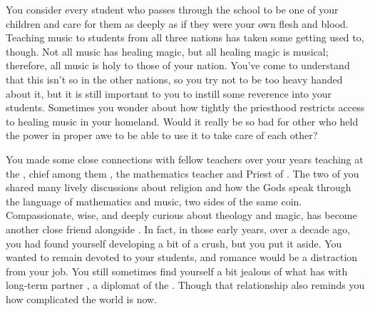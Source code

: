 \documentclass[char]{GL2020}
\begin{document}
You consider every student who passes through the school to be one of your children and care for them as deeply as if they were your own flesh and blood. Teaching music to students from all three nations has taken some getting used to, though. Not all music has healing magic, but all \pFarm{} healing magic is musical; therefore, all music is holy to those of your nation. You've come to understand that this isn't so in the other nations, so you try not to be too heavy handed about it, but it is still important to you to instill some reverence into your students. Sometimes you wonder about how tightly the priesthood restricts access to healing music in your homeland. Would it really be so bad for other \pFarmers{} who held the power in proper awe to be able to use it to take care of each other?

You made some close connections with fellow teachers over your years teaching at the \pSchool{}, chief among them \cFlowPriest{\intro}, the mathematics teacher and Priest of \cFlow{\intro}. The two of you shared many lively discussions about religion and how the Gods speak through the language of mathematics and music, two sides of the same coin. Compassionate, wise, and deeply curious about theology and magic, \cFlowPriest{} has become another close friend alongside \cBeetle{}. In fact, in those early years, over a decade ago, you had found yourself developing a bit of a crush, but you put it aside. You wanted to remain devoted to your students, and romance would be a distraction from your job. You still sometimes find yourself a bit jealous of what \cBeetle{} has with \cBeetle{\their} long-term partner \cJuniorStatesman{\intro}, a diplomat of the \pShippies{}. Though that relationship also reminds you how complicated the world is now. 
\end{document}
